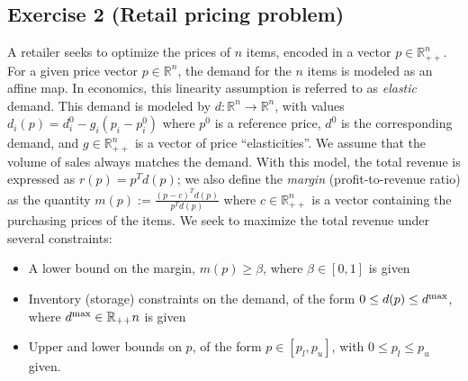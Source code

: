 \documentclass[11pt]{article}
\begin{document}
\newpage
\subsection*{Exercise 2 (Retail pricing problem)}

A retailer seeks to optimize the prices of $n$ items, encoded in a vector $p \in \mathbb{R}_{++}^{n}$. For a given price vector $p \in \mathbb{R}^{n}$, the demand for the $n$ items is modeled as an affine map. In economics, this linearity assumption is referred to as \emph{elastic} demand. This demand is modeled by $d : \mathbb{R}^{n} \rightarrow \mathbb{R}^{n}$, with values \( d_i(p) = d_i^0 - g_i (p_i-p_i^0) \) where $p^0$ is a reference price, $d^0$ is the corresponding demand, and $g \in \mathbb{R}_{++}^{n}$ is a vector of price ``elasticities''. We assume that the volume of sales always matches the demand. With this model, the total revenue is expressed as
$r(p) = p^Td(p)$; we also define the \emph{margin} (profit-to-revenue ratio) as the quantity $ m(p) :=\frac{(p-c)^Td(p)}{p^Td(p)} $ where $c \in \mathbb{R}_{++}^{n}$ is a vector containing the purchasing prices of the items. We seek to maximize the total revenue under several constraints:

\begin{itemize}
    \item A lower bound on the margin, $m(p) \ge \beta$, where $\beta \in [0,1]$ is given
    \item Inventory (storage) constraints on the demand, of the form $0 \le d(p) \le d^{\rm max}$, where $d^{\rm max} \in \mathbb{R}_{++}{n}$ is given
    \item Upper and lower bounds on $p$, of the form $p \in [p_l ,p_u]$, with $0 \le p_l \le p_u$ given.
\end{itemize}
\end{document}
